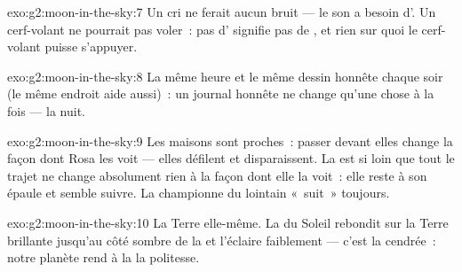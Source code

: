 \begin{solution}{exo:g2:moon-in-the-sky:7}
Un cri ne ferait aucun bruit --- le son a besoin d'. Un
cerf-volant ne pourrait pas voler~: pas d' signifie pas de ,
et rien sur quoi le cerf-volant puisse s'appuyer.
\end{solution}

\begin{solution}{exo:g2:moon-in-the-sky:8}
La même heure et le même dessin honnête chaque soir (le même endroit
aide aussi)~: un journal honnête ne change qu'une chose à la fois ---
la nuit.
\end{solution}

\begin{solution}{exo:g2:moon-in-the-sky:9}
Les maisons sont proches~: passer devant elles change la façon dont
Rosa les voit --- elles défilent et disparaissent. La  est si
loin que tout le trajet ne change absolument rien à la façon dont
elle la voit~: elle reste à son épaule et semble suivre. La
championne du lointain «~suit~» toujours.
\end{solution}

\begin{solution}{exo:g2:moon-in-the-sky:10}
La Terre elle-même. La  du Soleil rebondit sur la Terre
brillante jusqu'au côté sombre de la  et l'éclaire faiblement ---
c'est la  cendrée~: notre planète rend à la  la politesse.
\end{solution}
